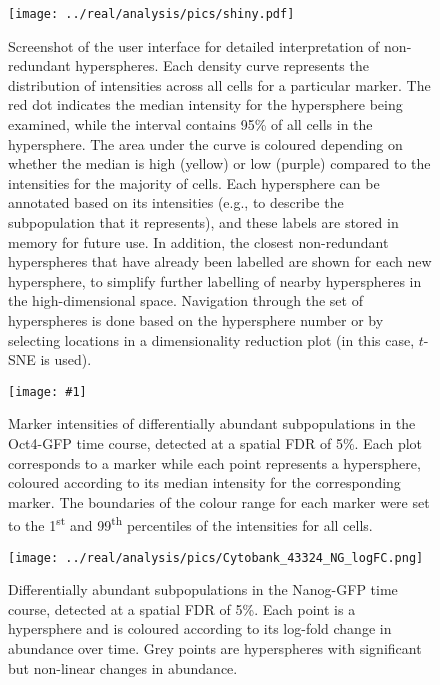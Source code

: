 \documentclass{article}
\begin{document}
\begin{figure}[tbp]
    \begin{center}
        \texttt{[image: ../real/analysis/pics/shiny.pdf]}
    \end{center}
    \caption{Screenshot of the user interface for detailed interpretation of non-redundant hyperspheres.
            Each density curve represents the distribution of intensities across all cells for a particular marker.
            The red dot indicates the median intensity for the hypersphere being examined, while the interval contains 95\% of all cells in the hypersphere.
            The area under the curve is coloured depending on whether the median is high (yellow) or low (purple) compared to the intensities for the majority of cells.
            Each hypersphere can be annotated based on its intensities (e.g., to describe the subpopulation that it represents), and these labels are stored in memory for future use.
            In addition, the closest non-redundant hyperspheres that have already been labelled are shown for each new hypersphere, to simplify further labelling of nearby hyperspheres in the high-dimensional space.
            Navigation through the set of hyperspheres is done based on the hypersphere number or by selecting locations in a dimensionality reduction plot (in this case, $t$-SNE is used).
}
\label{fig:shiny}
\end{figure}

\clearpage
\newcommand{\bigfigopt}[1]{\texttt{[image: \#1]}}

\begin{figure}[p]
    \begin{center}
    \bigfigopt{../real/analysis/pics/Cytobank_43324_4FI_markers.png}
    \end{center}
    \caption{
        Marker intensities of differentially abundant subpopulations in the Oct4-GFP time course, detected at a spatial FDR of 5\%.
        Each plot corresponds to a marker while each point represents a hypersphere, coloured according to its median intensity for the corresponding marker.
        The boundaries of the colour range for each marker were set to the 1\textsuperscript{st} and 99\textsuperscript{th} percentiles of the intensities for all cells.
    }
    \label{fig:oct4_markers}
\end{figure}

\begin{figure}[p]
    \begin{center}
    \texttt{[image: ../real/analysis/pics/Cytobank\_43324\_NG\_logFC.png]}
    \end{center}
    \caption{
        Differentially abundant subpopulations in the Nanog-GFP time course, detected at a spatial FDR of 5\%.
        Each point is a hypersphere and is coloured according to its log-fold change in abundance over time.
        Grey points are hyperspheres with significant but non-linear changes in abundance.
    }
\end{figure}
\end{document}
